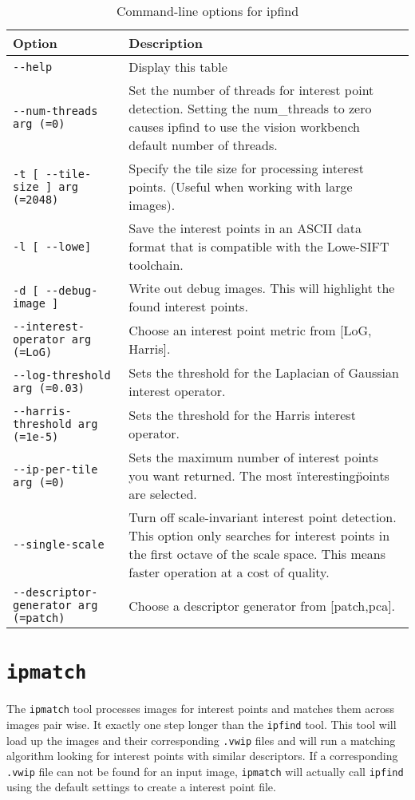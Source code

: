 \begin{longtable}{|l|p{9cm}|}
\caption{Command-line options for ipfind}
\label{tbl:ipfind}
\endfirsthead
\endhead
\endfoot
\endlastfoot
\hline
Option & Description \\ \hline \hline
\verb#--help# & Display this table\\ \hline
\verb#--num-threads arg (=0)# & Set the number of threads for interest point detection. Setting the num\_threads to zero causes ipfind to use the vision workbench default number of threads.\\ \hline
\verb#-t [ --tile-size ] arg (=2048)# & Specify the tile size for processing interest points. (Useful when working with large images).\\ \hline
\verb#-l [ --lowe]# & Save the interest points in an ASCII data format that is compatible with the Lowe-SIFT toolchain.\\ \hline
\verb#-d [ --debug-image ]# & Write out debug images. This will highlight the found interest points.\\ \hline
\verb#--interest-operator arg (=LoG)# & Choose an interest point metric from [LoG, Harris].\\ \hline
\verb#--log-threshold arg (=0.03)# & Sets the threshold for the Laplacian of Gaussian interest operator.\\ \hline
\verb#--harris-threshold arg (=1e-5)# & Sets the threshold for the Harris interest operator.\\ \hline
\verb#--ip-per-tile arg (=0)# & Sets the maximum number of interest points you want returned. The most \"interesting\" points are selected.\\ \hline
\verb#--single-scale# & Turn off scale-invariant interest point detection. This option only searches for interest points in the first octave of the scale space. This means faster operation at a cost of quality.\\ \hline
\verb#--descriptor-generator arg (=patch)# & Choose a descriptor generator from [patch,pca].\\ \hline
\end{longtable}


\section{{\tt ipmatch}}\label{sec:ipmatch}
The \verb#ipmatch# tool processes images for interest points and matches them across images pair wise. It exactly one step longer than the \verb#ipfind# tool. This tool will load up the images and their corresponding \verb#.vwip# files and will run a matching algorithm looking for interest points with similar descriptors. If a corresponding \verb#.vwip# file can not be found for an input image, \verb#ipmatch# will actually call \verb#ipfind# using the default settings to create a interest point file.

